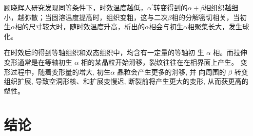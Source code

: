 顾晓辉\cite{guxiaohuiCuihuoShixiaowenduduiTC4taihejinzuzhihelixuexingnengdeyingxiang2011}人研究发现同等条件下，时效温度越低，$ \alpha^{\prime} $转变得到的$ \alpha+\beta  $相组织越细小，越弥散；当固溶温度提高时，组织变粗，这与二次$ \beta $相的分解密切相关，当初生$ \alpha $相的尺寸较大时，随时效温度升高，析出的$ \alpha $相会与初生$ \alpha $相聚集长大，发生球化。

在时效后的得到等轴组织和双态组织中，均含有一定量的等轴初 生 $\alpha$ 相。而拉伸变形通常是在等轴初生 $\alpha$ 相的某晶粒开始滑移，裂纹往往在在相界面上产生。 变形过程中，随着变形量的增大, 初生$\alpha$ 晶粒会产生更多的滑移, 并 向周围的 $\beta$ 转变组织扩展, 导致空洞形核、和扩展变慢迟, 断裂前将产生更大的变形, 从而获更高的塑性\cite{yekangyuanRechuliduiTC4taihejinduanjianzuzhihexingnengdeyingxiang2022}。

\section{结论}
